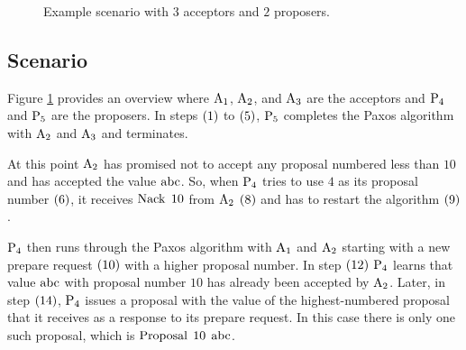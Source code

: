 \begin{figure}
\caption{Example scenario with $3$ acceptors and $2$ proposers.}
\label{fig:scenario}
\end{figure}

\subsection{Scenario}
Figure \ref{fig:scenario} provides an overview where $\operatorname{A_1}$, $\operatorname{A_2}$, and $\operatorname{A_3}$ are the acceptors and $\operatorname{P_4}$ and $\operatorname{P_5}$ are the proposers.
In steps $\left(1\right)$ to $\left(5\right)$, $\operatorname{P_5}$ completes the Paxos algorithm with $\operatorname{A_2}$ and $\operatorname{A_3}$ and terminates.

At this point $\operatorname{A_2}$ has promised not to accept any proposal numbered less than $10$ and has accepted the value $\operatorname{abc}$.
So, when $\operatorname{P_4}$ tries to use $4$ as its proposal number $\left(6\right)$, it receives $\operatorname{Nack}\; 10$ from $\operatorname{A_2}$ $\left(8\right)$ and has to restart the algorithm $\left(9\right)$.

$\operatorname{P_4}$ then runs through the Paxos algorithm with $\operatorname{A_1}$ and $\operatorname{A_2}$ starting with a new prepare request $\left(10\right)$ with a higher proposal number.
In step $\left(12\right)$ $\operatorname{P_4}$ learns that value $\operatorname{abc}$ with proposal number $10$ has already been accepted by $\operatorname{A_2}$.
Later, in step $\left(14\right)$, $\operatorname{P_4}$ issues a proposal with the value of the highest-numbered proposal that it receives as a response to its prepare request.
In this case there is only one such proposal, which is $\operatorname{Proposal}\; 10\; \operatorname{abc}$.

